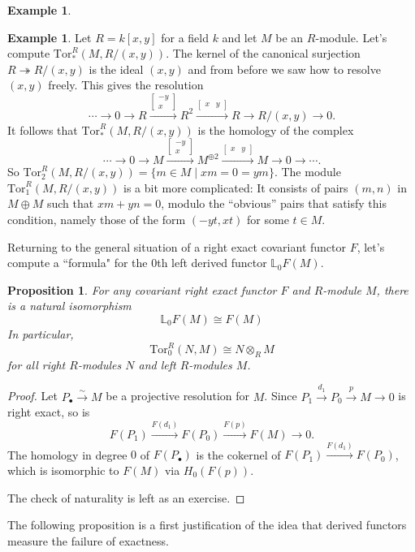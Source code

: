 \documentclass{amsart}[12pt]
\newcommand{\Tor}{\mathrm{Tor}}
\newcommand{\onto}{\twoheadrightarrow}
\newcommand{\bL}{{\mathbb{L}}}
\numberwithin{equation}{section}
\theoremstyle{plain} %
\newtheorem{prop}[equation]{Proposition}
\theoremstyle{definition}
\newtheorem{ex}[equation]{Example}
\theoremstyle{remark}
\newcommand{\xra}[1]{\xrightarrow{#1}}
\begin{document}
\begin{ex}
\begin{ex} Let $R = k[x,y]$ for a field $k$ and let $M$ be an $R$-module. Let's compute $\Tor_*^R(M, R/(x,y))$. 
The kernel of the canonical surjection $R \onto R/(x,y)$ is the ideal $(x,y)$ and from before we saw how to resolve $(x,y)$ freely. This gives the resolution
$$
\cdots \to 0 \to R \xra{\begin{bmatrix} -y \\ x \end{bmatrix}} R^2 \xra{\begin{bmatrix} x& y\end{bmatrix}} R \to R/(x,y) \to 0.
$$
It follows that $\Tor_*^R(M, R/(x,y))$ is the homology of the complex
$$
\cdots \to 0 \to M \xra{\begin{bmatrix} -y \\ x \end{bmatrix}} M^{\oplus 2} \xra{\begin{bmatrix} x& y\end{bmatrix}} M \to 0 \to \cdots.
$$
So $\Tor_2^R(M, R/(x,y)) = \{m \in M \mid x m = 0 = y m \}$. The module $\Tor_1^R(M, R/(x,y))$ is a bit more complicated: It consists
of pairs $(m,n)$ in $M \oplus M$ such that $x m + y n = 0$, modulo the ``obvious'' pairs that satisfy this condition, namely those of the form
$(-yt, xt)$ for some $t \in M$.
\end{ex}

Returning to the general situation of a right exact covariant functor $F$,  let's compute a ``formula" for the 0th left derived functor $\bL_0F(M)$.

\begin{prop} For any covariant right exact functor $F$ and $R$-module $M$, there is a natural isomorphism 
$$
\bL_0 F(M) \cong F(M)
$$
In particular,
$$
\Tor_0^R(N,M) \cong N \otimes_R M
$$
for all right $R$-modules $N$ and left $R$-modules $M$. 
\end{prop}
\begin{proof}
Let $P_\bullet \xra{\sim} M$ be a projective resolution for $M$.
Since $P_1 \xra{d_1} P_0 \xra{p} M \to 0$ is right exact, so is
$$
F(P_1) \xra{F(d_1)} F(P_0) \xra{F(p)}  F(M) \to 0.
$$
The homology in degree $0$ of $F(P_\bullet)$ is the cokernel of $F(P_1) \xra{F(d_1)} F(P_0)$, which is isomorphic to $F(M)$ via $H_0(F(p))$.

The check of naturality is left as an exercise.
\end{proof}

The following proposition is a first justification of the idea that derived functors measure the failure of exactness.




\end{ex}
\end{document}
